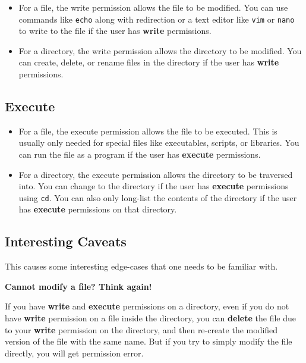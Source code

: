 \begin{itemize}
  \item For a file, the write permission allows the file to be modified.
    You can use commands like \lstinline|echo| along with redirection
    or a text editor like \lstinline|vim| or \lstinline|nano|
      to write to the file if the user has \textbf{write} permissions.
  \item For a directory, the write permission allows the directory to be modified.
    You can create, delete, or rename files in the directory if the user has \textbf{write} permissions.
\end{itemize}

\subsection{Execute}

\begin{itemize}
  \item For a file, the execute permission allows the file to be executed.
    This is usually only needed for special files like executables,
    scripts, or libraries.
    You can run the file as a program if the user has \textbf{execute} permissions.
  \item For a directory, the execute permission allows the directory to be traversed into.
    You can change to the directory if the user has \textbf{execute} permissions using \lstinline|cd|.
    You can also only long-list the contents of the directory if the user has \textbf{execute} permissions on that directory.
\end{itemize}

\subsection{Interesting Caveats}

This causes some interesting edge-cases that one needs to be familiar with.

\textbf{Cannot modify a file? Think again!}

If you have \textbf{write} and \textbf{execute} permissions on a directory, even if you do not have \textbf{write} permission on a file inside the directory, you can \textbf{delete} the file due to your \textbf{write} permission on the directory, and then re-create the modified version of the file with the same name.
But if you try to simply modify the file directly, you will get permission error.


